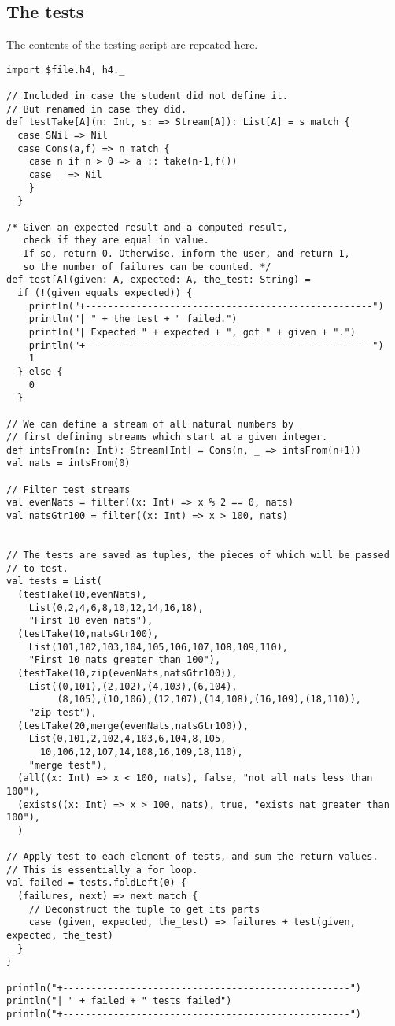 \documentclass[11pt]{article}
\begin{document}
\subsection*{The tests}
\label{sec:orgb6bcebf}
The contents of the testing script are repeated here.

\begin{verbatim}
import $file.h4, h4._

// Included in case the student did not define it.
// But renamed in case they did.
def testTake[A](n: Int, s: => Stream[A]): List[A] = s match {
  case SNil => Nil
  case Cons(a,f) => n match {
    case n if n > 0 => a :: take(n-1,f())
    case _ => Nil
    }
  }

/* Given an expected result and a computed result,
   check if they are equal in value.
   If so, return 0. Otherwise, inform the user, and return 1,
   so the number of failures can be counted. */
def test[A](given: A, expected: A, the_test: String) =
  if (!(given equals expected)) {
    println("+---------------------------------------------------")
    println("| " + the_test + " failed.")
    println("| Expected " + expected + ", got " + given + ".")
    println("+---------------------------------------------------")
    1
  } else {
    0
  }

// We can define a stream of all natural numbers by
// first defining streams which start at a given integer.
def intsFrom(n: Int): Stream[Int] = Cons(n, _ => intsFrom(n+1))
val nats = intsFrom(0)

// Filter test streams
val evenNats = filter((x: Int) => x % 2 == 0, nats)
val natsGtr100 = filter((x: Int) => x > 100, nats)


// The tests are saved as tuples, the pieces of which will be passed
// to test.
val tests = List(
  (testTake(10,evenNats),
    List(0,2,4,6,8,10,12,14,16,18),
    "First 10 even nats"),
  (testTake(10,natsGtr100),
    List(101,102,103,104,105,106,107,108,109,110),
    "First 10 nats greater than 100"),
  (testTake(10,zip(evenNats,natsGtr100)),
    List((0,101),(2,102),(4,103),(6,104),
         (8,105),(10,106),(12,107),(14,108),(16,109),(18,110)),
    "zip test"),
  (testTake(20,merge(evenNats,natsGtr100)),
    List(0,101,2,102,4,103,6,104,8,105,
      10,106,12,107,14,108,16,109,18,110),
    "merge test"),
  (all((x: Int) => x < 100, nats), false, "not all nats less than 100"),
  (exists((x: Int) => x > 100, nats), true, "exists nat greater than 100"),
  )

// Apply test to each element of tests, and sum the return values.
// This is essentially a for loop.
val failed = tests.foldLeft(0) {
  (failures, next) => next match {
    // Deconstruct the tuple to get its parts
    case (given, expected, the_test) => failures + test(given, expected, the_test)
  }
}

println("+---------------------------------------------------")
println("| " + failed + " tests failed")
println("+---------------------------------------------------")
\end{verbatim}
\end{document}
